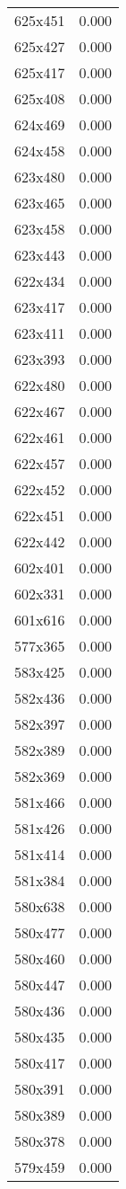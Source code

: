\begin{table}
\begin{tabular}{lr}
625x451 & 0.000 \\
625x427 & 0.000 \\
625x417 & 0.000 \\
625x408 & 0.000 \\
624x469 & 0.000 \\
624x458 & 0.000 \\
623x480 & 0.000 \\
623x465 & 0.000 \\
623x458 & 0.000 \\
623x443 & 0.000 \\
622x434 & 0.000 \\
623x417 & 0.000 \\
623x411 & 0.000 \\
623x393 & 0.000 \\
622x480 & 0.000 \\
622x467 & 0.000 \\
622x461 & 0.000 \\
622x457 & 0.000 \\
622x452 & 0.000 \\
622x451 & 0.000 \\
622x442 & 0.000 \\
602x401 & 0.000 \\
602x331 & 0.000 \\
601x616 & 0.000 \\
577x365 & 0.000 \\
583x425 & 0.000 \\
582x436 & 0.000 \\
582x397 & 0.000 \\
582x389 & 0.000 \\
582x369 & 0.000 \\
581x466 & 0.000 \\
581x426 & 0.000 \\
581x414 & 0.000 \\
581x384 & 0.000 \\
580x638 & 0.000 \\
580x477 & 0.000 \\
580x460 & 0.000 \\
580x447 & 0.000 \\
580x436 & 0.000 \\
580x435 & 0.000 \\
580x417 & 0.000 \\
580x391 & 0.000 \\
580x389 & 0.000 \\
580x378 & 0.000 \\
579x459 & 0.000 \\

\end{tabular}
\end{table}
